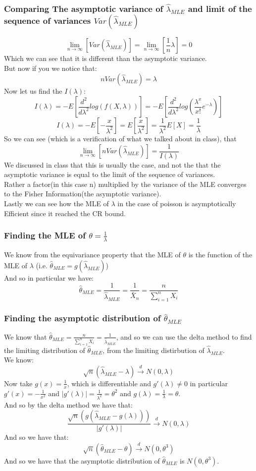 \documentclass[12pt]{article}
\begin{document}
\subsubsection*{Comparing The asymptotic variance of $\hat{\lambda}_{MLE}$ and limit of the sequence of variances $Var(\hat{\lambda}_{MLE})$}
\[
\lim_{n\to \infty}[Var(\hat{\lambda}_{MLE})] = \lim_{n\to \infty}[\frac{1}{n}\lambda] = 0
\]
Which we can see that it is different than the asymptotic variance. \\
But now if you we notice that:
\[
nVar(\hat{\lambda}_{MLE}) = \lambda
\]
Now let us find the $I(\lambda)$:
\[
I(\lambda) = -E[\frac{d^2}{d\lambda^2}log(f(X,\lambda))] = -E[\frac{d^2}{d\lambda^2}log(\frac{\lambda^x}{x!}e^{-\lambda})]
\]
\[
I(\lambda) = -E[-\frac{x}{\lambda^2}] = E[\frac{x}{\lambda^2}] = \frac{1}{\lambda^2}E[X] = \frac{1}{\lambda}
\]
So we can see (which is a verification of what we talked about in class), that 
\[
\lim_{n\to \infty}[nVar(\hat{\lambda}_{MLE})] = \frac{1}{I(\lambda)}
\]
We discussed in class that this is usually the case, and not the that the asymptotic variance is equal to the limit of the sequence of variances.\\ 
Rather a factor(in this case n) multiplied by the variance of the MLE converges to the Fisher Information(the asymptotic variance).\\
Lastly we can see how the MLE of $\lambda$ in the case of poisson is asymptotically Efficient since it reached the CR bound.
\subsubsection*{Finding the MLE of $\theta = \frac{1}{\lambda}$}
We know from the equivariance property that the MLE of $\theta$ is the function of the MLE of $\lambda$ (i.e. $\hat{\theta}_{MLE} = g(\hat{\lambda}_{MLE})$)\\
And so in particular we have: 
\[
\hat{\theta}_{MLE} = \frac{1}{\hat{\lambda}_{MLE}} = \frac{1}{\bar{X}_n} =\frac{n}{\sum_{i=1}^{n}X_i}
\]
\subsubsection*{Finding the asymptotic distribution of $\hat{\theta}_{MLE}$}
We know that $\hat{\theta}_{MLE} = \frac{n}{\sum_{i=1}^{n}X_i} = \frac{1}{\hat{\lambda}_{MLE}}$, and so we can use the delta method to find the limiting distribution of $\hat{\theta}_{MLE}$, from the limiting distirbution of $\hat{\lambda}_{MLE}$.\\
We know: 
\[
\sqrt{n}(\hat{\lambda}_{MLE}-\lambda) \xrightarrow{d} N(0,\lambda)
\]
Now take $g(x) = \frac{1}{x}$, which is differentiable and $g'(\lambda) \neq 0$ in particular $g'(x) = -\frac{1}{x^2}$ and $|g'(\lambda)| = \frac{1}{\lambda^2} = \theta^2$ and $g(\lambda) = \frac{1}{\lambda} = \theta$.\\
And so by the delta method we have that:
\[
\frac{\sqrt{n}(g(\hat{\lambda}_{MLE}-g(\lambda)))}{|g'(\lambda)|} \xrightarrow{d} N(0,\lambda)
\]
And so we have that: 
\[
\sqrt{n}(\hat{\theta}_{MLE}-\theta) \xrightarrow{d} N(0,\theta^3)
\] 
And so we have that the asymptotic distribution of $\hat{\theta}_{MLE}$ is $N(0,\theta^3)$. \\
\end{document}
